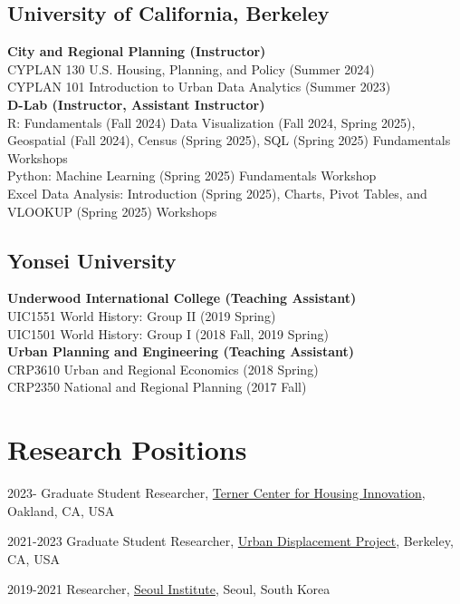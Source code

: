 \documentclass[12pt,letterpaper]{report}
\begin{document}
    \subsection*{University of California, Berkeley}
    \textbf{City and Regional Planning  (Instructor)}\\
      CYPLAN 130 U.S. Housing, Planning, and Policy (Summer 2024)\\
      CYPLAN 101 Introduction to Urban Data Analytics (Summer 2023)\\[0.6em]
    \textbf{D-Lab (Instructor, Assistant Instructor)}\\ 
      R: Fundamentals (Fall 2024) Data Visualization (Fall 2024, Spring 2025), Geospatial (Fall 2024), Census  (Spring 2025), SQL (Spring 2025) Fundamentals Workshops\\
      Python: Machine Learning (Spring 2025) Fundamentals Workshop\\
      Excel Data Analysis: Introduction (Spring 2025), Charts, Pivot Tables, and VLOOKUP (Spring 2025) Workshops
      
   \subsection*{Yonsei University}
   \textbf{Underwood International College (Teaching Assistant)}\\ 
    UIC1551 World History: Group II (2019 Spring)\\
    UIC1501 World History: Group I  (2018 Fall, 2019 Spring)\\[0.6em]
  \textbf{Urban Planning and Engineering (Teaching Assistant)}\\ 
    CRP3610 Urban and Regional Economics (2018 Spring)\\
    CRP2350 National and Regional Planning (2017 Fall)

  \section*{Research Positions}
    \begin{tablist}
        \item[2023-] \tab{}Graduate Student Researcher, \href{https://ternercenter.berkeley.edu/}{Terner Center for Housing Innovation}, Oakland, CA, USA
        \item[2021-2023] \tab{}Graduate Student Researcher, \href{https://www.urbandisplacement.org/}{Urban Displacement Project}, Berkeley, CA, USA
        \item[2019-2021] \tab{}Researcher, \href{si.re.kr}{Seoul Institute}, Seoul, South Korea
    \end{tablist}
\end{document}
